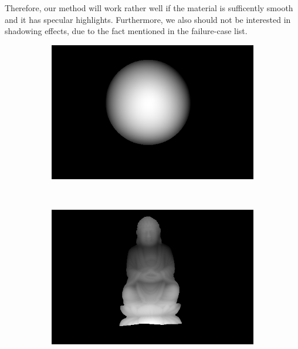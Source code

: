 \documentclass{paper}
\begin{document}
Therefore, our method will work rather well if the material is sufficently smooth and it has specular highlights. Furthermore, we also should not be interested in shadowing effects, due to the fact mentioned in the failure-case list.

\begin{figure}[h!]
    \centering
    \begin{subfigure}{0.3\textwidth}
        \includegraphics[width=\textwidth]{results/gray/gray_depthmap}
    \end{subfigure}
    ~
    \begin{subfigure}{0.3\textwidth}
        \includegraphics[width=\textwidth]{results/buddha/buddha_depthmap}
    \end{subfigure}
    ~
    \begin{subfigure}{0.3\textwidth}

\end{subfigure}
\end{figure}
\end{document}

